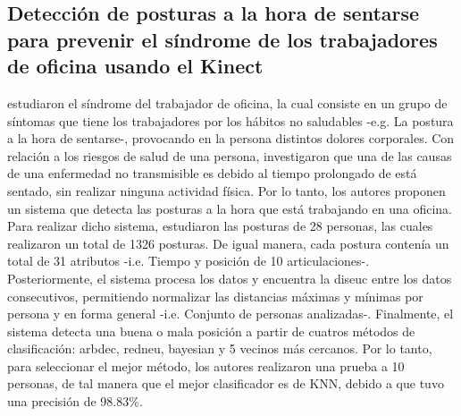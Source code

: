 \subsection{Detecci\'on de posturas a la hora de sentarse para prevenir el s\'indrome de los trabajadores de oficina usando el Kinect} \label{tr:3}
 estudiaron el s\'indrome del trabajador de oficina, la cual consiste en un grupo de s\'intomas que tiene los trabajadores por los h\'abitos no saludables -e.g. La postura a la hora de sentarse-, provocando en la persona distintos dolores corporales.
\medbreak
Con relaci\'on a los riesgos de salud de una persona,  investigaron que una de las causas de una enfermedad no transmisible es debido al tiempo prolongado de est\'a sentado, sin realizar ninguna actividad f\'isica. Por lo tanto, los autores  proponen un sistema que detecta las posturas a la hora que est\'a trabajando en una oficina.
\medbreak
Para realizar dicho sistema,  estudiaron las posturas de 28 personas, las cuales realizaron un total de 1326 posturas. De igual manera, cada postura conten\'ia un total de 31 atributos -i.e. Tiempo y posici\'on de 10 articulaciones-. Posteriormente, el sistema procesa los datos y encuentra la \gls{diseuc} entre los datos consecutivos, permitiendo normalizar las distancias m\'aximas y m\'inimas por persona y en forma general -i.e. Conjunto de personas analizadas-.
\medbreak
Finalmente, el sistema detecta una buena o mala posici\'on a partir de cuatros m\'etodos de clasificaci\'on: \gls{arbdec}, \gls{redneu}, \gls{bayesian} y 5 vecinos m\'as cercanos. Por lo tanto, para seleccionar el mejor m\'etodo, los autores realizaron una prueba a 10 personas, de tal manera que el mejor  clasificador es de \acrfull{KNN}, debido a que tuvo una precisi\'on de  98.83\%. 
